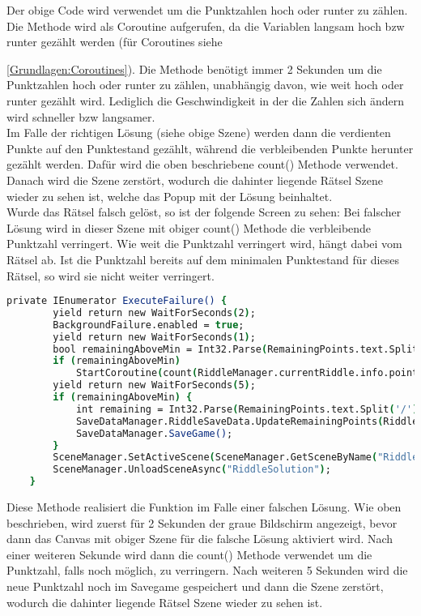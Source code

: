 Der obige Code wird verwendet um die Punktzahlen hoch oder runter zu zählen. Die Methode wird als Coroutine aufgerufen, da die Variablen langsam hoch bzw runter gezählt werden (für Coroutines siehe {\ref{Grundlagen:Coroutines}). Die Methode benötigt immer 2 Sekunden um die Punktzahlen hoch oder runter zu zählen, unabhängig davon, wie weit hoch oder runter gezählt wird. Lediglich die Geschwindigkeit in der die Zahlen sich ändern wird schneller bzw langsamer.\\

Im Falle der richtigen Lösung (siehe obige Szene) werden dann die verdienten Punkte auf den Punktestand gezählt, während die verbleibenden Punkte herunter gezählt werden. Dafür wird die oben beschriebene count() Methode verwendet. Danach wird die Szene zerstört, wodurch die dahinter liegende Rätsel Szene wieder zu sehen ist, welche das Popup mit der Lösung beinhaltet.\\

Wurde das Rätsel falsch gelöst, so ist der folgende Screen zu sehen:
Bei falscher Lösung wird in dieser Szene mit obiger count() Methode die verbleibende Punktzahl verringert. Wie weit die Punktzahl verringert wird, hängt dabei vom Rätsel ab. Ist die Punktzahl bereits auf dem minimalen Punktestand für dieses Rätsel, so wird sie nicht weiter verringert.
\begin{lstlisting}[language=csh, caption={Methode für die Szene bei falschen Lösungen}]
private IEnumerator ExecuteFailure() {
        yield return new WaitForSeconds(2);
        BackgroundFailure.enabled = true;
        yield return new WaitForSeconds(1);
        bool remainingAboveMin = Int32.Parse(RemainingPoints.text.Split('/')[0]) > RiddleManager.currentRiddle.info.minPoints;
        if (remainingAboveMin)
            StartCoroutine(count(RiddleManager.currentRiddle.info.pointReduction, false, RemainingPoints));
        yield return new WaitForSeconds(5);
        if (remainingAboveMin) {
            int remaining = Int32.Parse(RemainingPoints.text.Split('/')[0]);
            SaveDataManager.RiddleSaveData.UpdateRemainingPoints(RiddleManager.riddleId, remaining);
            SaveDataManager.SaveGame();
        }
        SceneManager.SetActiveScene(SceneManager.GetSceneByName("Riddle"));
        SceneManager.UnloadSceneAsync("RiddleSolution");
    }
\end{lstlisting}
Diese Methode realisiert die Funktion im Falle einer falschen Lösung. Wie oben beschrieben, wird zuerst für 2 Sekunden der graue Bildschirm angezeigt, bevor dann das Canvas mit obiger Szene für die falsche Lösung aktiviert wird. Nach einer weiteren Sekunde wird dann die count() Methode verwendet um die Punktzahl, falls noch möglich, zu verringern. Nach weiteren 5 Sekunden wird die neue Punktzahl noch im Savegame gespeichert und dann die Szene zerstört, wodurch die dahinter liegende Rätsel Szene wieder zu sehen ist.

}
